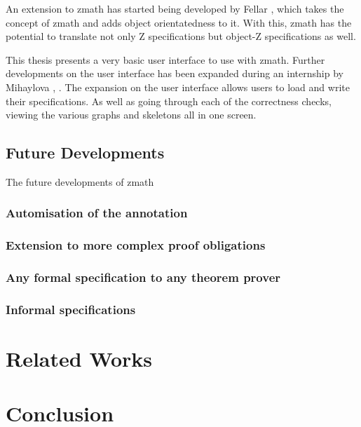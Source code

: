 An extension to \gls{zmath} has started being developed by Fellar \cite{zmathmaster}, \cite{ozmathconference} which takes the concept of \gls{zmath} and adds object orientatedness to it. With this, \gls{zmath} has the potential to translate not only Z specifications but object-Z specifications as well. 

This thesis presents a very basic user interface to use with \gls{zmath}. Further developments on the user interface has been expanded during an internship by Mihaylova \cite{zmathuser}, \cite{zmathinternship}. The expansion on the user interface allows users to load and write their specifications. As well as going through each of the correctness checks, viewing the various graphs and skeletons all in one screen.

\subsection{Future Developments}
\label{subsec:futuredevelopments}

The future developments of \gls{zmath} 

\subsubsection{Automisation of the annotation}

\subsubsection{Extension to more complex proof obligations}

\subsubsection{Any formal specification to any theorem prover}

\subsubsection{Informal specifications}

\section{Related Works}
\label{sec:relatedworks}

\section{Conclusion}
\label{sec:conclusion}